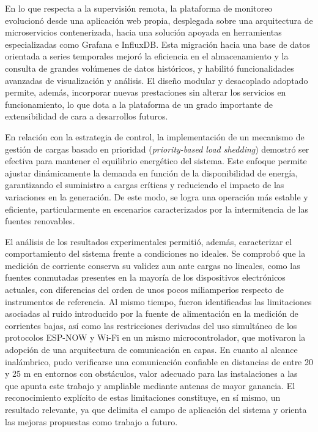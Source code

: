 En lo que respecta a la supervisión remota, la plataforma de monitoreo evolucionó desde una aplicación web propia, desplegada sobre una arquitectura de microservicios contenerizada, hacia una solución apoyada en herramientas especializadas como Grafana e InfluxDB. Esta migración hacia una base de datos orientada a series temporales mejoró la eficiencia en el almacenamiento y la consulta de grandes volúmenes de datos históricos, y habilitó funcionalidades avanzadas de visualización y análisis. El diseño modular y desacoplado adoptado permite, además, incorporar nuevas prestaciones sin alterar los servicios en funcionamiento, lo que dota a la plataforma de un grado importante de extensibilidad de cara a desarrollos futuros.

En relación con la estrategia de control, la implementación de un mecanismo de gestión de cargas basado en prioridad (\textit{priority-based load shedding}) demostró ser efectiva para mantener el equilibrio energético del sistema. Este enfoque permite ajustar dinámicamente la demanda en función de la disponibilidad de energía, garantizando el suministro a cargas críticas y reduciendo el impacto de las variaciones en la generación. De este modo, se logra una operación más estable y eficiente, particularmente en escenarios caracterizados por la intermitencia de las fuentes renovables.

El análisis de los resultados experimentales permitió, además, caracterizar el comportamiento del sistema frente a condiciones no ideales. Se comprobó que la medición de corriente conserva su validez aun ante cargas no lineales, como las fuentes conmutadas presentes en la mayoría de los dispositivos electrónicos actuales, con diferencias del orden de unos pocos miliamperios respecto de instrumentos de referencia. Al mismo tiempo, fueron identificadas las limitaciones asociadas al ruido introducido por la fuente de alimentación en la medición de corrientes bajas, así como las restricciones derivadas del uso simultáneo de los protocolos ESP-NOW y Wi-Fi en un mismo microcontrolador, que motivaron la adopción de una arquitectura de comunicación en capas. En cuanto al alcance inalámbrico, pudo verificarse una comunicación confiable en distancias de entre 20 y 25 m en entornos con obstáculos, valor adecuado para las instalaciones a las que apunta este trabajo y ampliable mediante antenas de mayor ganancia. El reconocimiento explícito de estas limitaciones constituye, en sí mismo, un resultado relevante, ya que delimita el campo de aplicación del sistema y orienta las mejoras propuestas como trabajo a futuro.


